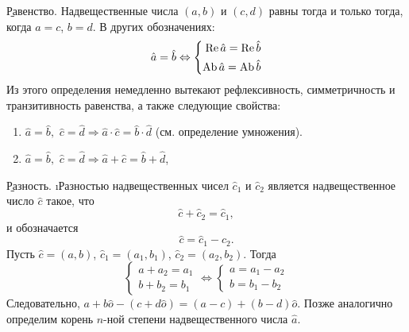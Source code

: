 \b{Равенство.} Надвещественные числа $(a, b)$ и $(c, d)$ равны тогда и только тогда, когда $a=c$, $b=d$. В других обозначениях:
	\begin{equation}
	  \hat{a}=\hat{b}\Leftrightarrow
		\left\{
			\begin{aligned}
				\operatorname{Re} \hat a=\operatorname{Re} \hat b \\
				\operatorname{Ab}{\hat a}=\operatorname{Ab}{\hat b}
			\end{aligned}
		\right.
	\end{equation}
Из этого определения немедленно вытекают рефлексивность, симметричность и транзитивность равенства, а также следующие свойства:
\begin{enumerate}
	\item $\hat{a}=\hat{b},\,\,\hat{c}=\hat{d}\Rightarrow \hat{a}\cdot\hat{c}=\hat{b}\cdot\hat{d}$ (см. определение умножения).
	\item $\hat{a}=\hat{b},\,\,\hat{c}=\hat{d}\Rightarrow \hat{a}+\hat{c}=\hat{b}+\hat{d}$,
\end{enumerate}

\b{Разность.} \i{Разностью} надвещественных чисел $\hat{c}_1$ и $\hat{c}_2$ является надвещественное число $\hat{c}$ такое, что
	$$\hat{c}+\hat{c}_2=\hat{c}_1,$$
и обозначается
	$$\hat{c}=\hat{c}_1-\hat{c}_2.$$
Пусть $\hat{c}=(a, b)$, $\hat{c}_1=(a_1, b_1)$, $\hat{c}_2=(a_2, b_2)$. Тогда
	$$ \left\{
			\begin{aligned}
				a+a_2=a_1 \\
				b+b_2=b_1
			\end{aligned}
		\right.
		\Leftrightarrow
		\left\{
			\begin{aligned}
				a=a_1-a_2\\
				b=b_1-b_2
			\end{aligned}
		\right.
	$$
Следовательно, $a+b\hat{o}-(c+d\hat{o})=(a-c)+(b-d)\hat{o}$. Позже аналогично определим корень $n$-ной степени надвещественного числа $\hat{a}$.

